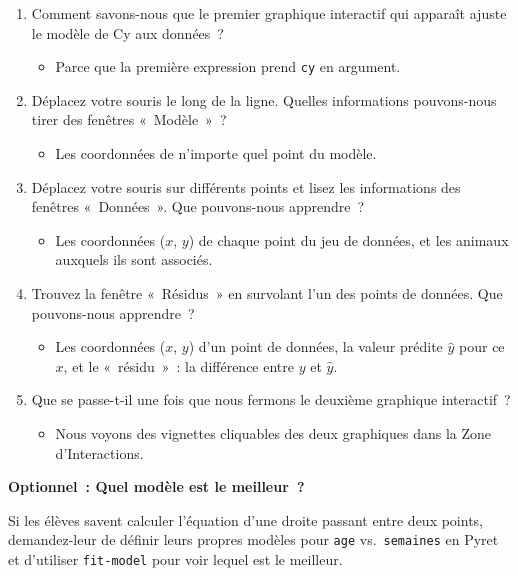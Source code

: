 \documentclass[12pt,a4paper]{article}
\begin{document}
\begin{activitybox}
  \begin{enumerate}[leftmargin=*]
    \item Comment savons-nous que le premier graphique interactif qui apparaît ajuste le modèle de Cy aux données~?
    \begin{itemize}
      \item Parce que la première expression prend \texttt{cy} en argument.
    \end{itemize}
    \item Déplacez votre souris le long de la ligne. Quelles informations pouvons-nous tirer des fenêtres «~Modèle~»~?
    \begin{itemize}
      \item Les coordonnées de n'importe quel point du modèle.
    \end{itemize}
    \item Déplacez votre souris sur différents points et lisez les informations des fenêtres «~Données~». Que pouvons-nous apprendre~?
    \begin{itemize}
      \item Les coordonnées ($x$, $y$) de chaque point du jeu de données, et les animaux auxquels ils sont associés.
    \end{itemize}
    \item Trouvez la fenêtre «~Résidus~» en survolant l'un des points de données. Que pouvons-nous apprendre~?
    \begin{itemize}
      \item Les coordonnées ($x$, $y$) d'un point de données, la valeur prédite $\hat{y}$ pour ce $x$, et le «~résidu~»~: la différence entre $y$ et $\hat{y}$.
    \end{itemize}
    \item Que se passe-t-il une fois que nous fermons le deuxième graphique interactif~?
    \begin{itemize}
      \item Nous voyons des vignettes cliquables des deux graphiques dans la Zone d'Interactions.
    \end{itemize}
  \end{enumerate}
\end{activitybox}

\begin{instructornotes}
  \textbf{Optionnel~: Quel modèle est le meilleur~?}

  Si les élèves savent calculer l'équation d'une droite passant entre deux points, demandez-leur de définir leurs propres modèles pour \texttt{age} vs.\ \texttt{semaines} en Pyret et d'utiliser \texttt{fit-model} pour voir lequel est le meilleur.
\end{instructornotes}
\end{document}
